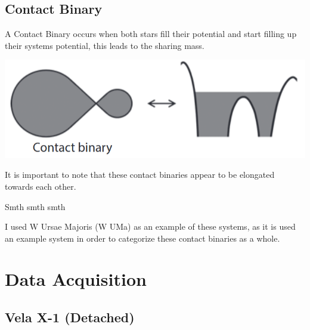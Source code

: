 \documentclass[12pt, letterpaper]{article}
\begin{document}
 
        

        \subsection{\centering Contact Binary}
        A Contact Binary occurs when both stars fill their potential and start filling up their systems potential, this leads to the sharing mass.
        
        \begin{center}
        \includegraphics[scale = .4]{Figs/Conact Binary.png}
        \end{center}

        It is important to note that these contact binaries appear to be elongated towards each other. 

        Smth smth smth

        I used W Ursae Majoris (W UMa) as an example of these systems, as it is used an example system in order to categorize these contact binaries as a whole.

        
\section{\centering Data Acquisition}
    \subsection{\centering Vela X-1 (Detached)}
    
\end{document}
